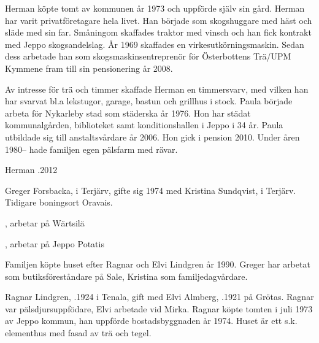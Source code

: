 Herman köpte tomt av kommunen år 1973 och uppförde själv sin gård. Herman har varit privatföretagare hela livet. Han började som skogshuggare med häst och släde med sin far. Småningom skaffades traktor med vinsch och han fick kontrakt med Jeppo skogsandelslag. År 1969 skaffades en virkesutkörningsmaskin. Sedan dess arbetade han som skogsmaskinsentreprenör för Österbottens Trä/UPM Kymmene fram till sin pensionering år 2008.

Av intresse för trä och timmer skaffade Herman en timmersvarv, med vilken han har svarvat bl.a lekstugor, garage, bastun och grillhus i stock. Paula började arbeta för Nykarleby stad som städerska år 1976. Hon har städat kommunalgården, biblioteket samt konditionshallen i Jeppo i 34 år. Paula utbildade sig till anstaltsvårdare år 2006. Hon gick i pension 2010. Under åren 1980-- hade familjen egen pälsfarm med rävar.

Herman .2012



%



%
Greger Forsbacka,  i Terjärv, gifte sig 1974 med Kristina Sundqvist,  i Terjärv. Tidigare boningsort Oravais.
\begin{jhchildren}
  \item {}, arbetar på Wärtsilä
  \item {}, arbetar på Jeppo Potatis
\end{jhchildren}

Familjen köpte huset efter Ragnar och Elvi Lindgren år 1990. Greger har arbetat som butiksföreståndare på Sale, Kristina som familjedagvårdare.


%
Ragnar Lindgren, .1924 i Tenala, gift med Elvi Almberg, .1921 på Grötas. Ragnar var pälsdjursuppfödare, Elvi arbetade vid Mirka. Ragnar köpte tomten i juli 1973 av Jeppo kommun, han uppförde bostadsbyggnaden år 1974. Huset är ett s.k. elementhus med fasad av trä och tegel.

